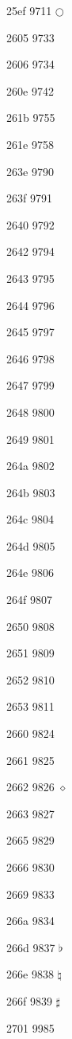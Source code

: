 \documentclass[11pt]{article}
\begin{document}



25ef 9711 \ensuremath{\bigcirc}

2605 9733 \bigstar

2606 9734 

260e 9742 

261b 9755 

261e 9758 

263e 9790 \rightmoon

263f 9791 \mercury

2640 9792 \venus

2642 9794 \male

2643 9795 \jupiter

2644 9796 \saturn

2645 9797 \uranus

2646 9798 \neptune

2647 9799 \pluto

2648 9800 \aries

2649 9801 \taurus

264a 9802 \gemini

264b 9803 \cancer

264c 9804 \leo

264d 9805 \virgo

264e 9806 \libra

264f 9807 \scorpio

2650 9808 \sagittarius

2651 9809 \capricornus

2652 9810 \aquarius

2653 9811 \pisces

2660 9824 \spadesuit

2661 9825 \heartsuit

2662 9826 \ensuremath{\diamond}

2663 9827 \clubsuit

2665 9829 

2666 9830 

2669 9833 \quarternote

266a 9834 \eighthnote

266d 9837 \ensuremath{\flat}

266e 9838 \ensuremath{\natural}

266f 9839 \ensuremath{\sharp}

2701 9985 
\end{document}
